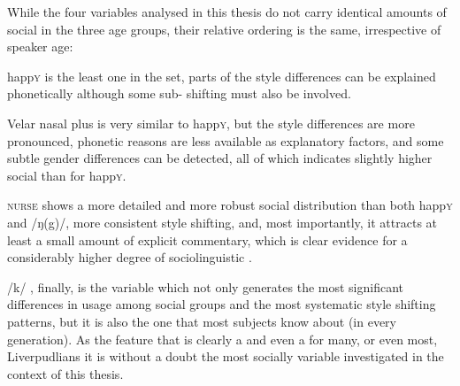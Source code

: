 While the four variables analysed in this thesis do not carry identical amounts of social  in the three age groups, their relative ordering is the same, irrespective of speaker age:
\begin{inparaenum}[(1)]
	\item happ\textsc{y} is the least  one in the set, parts of the style differences can be explained phonetically although some sub- shifting must also be involved.
	\item Velar nasal plus is very similar to happ\textsc{y}, but the style differences are more pronounced, phonetic reasons are less available as explanatory factors, and some subtle gender differences can be detected, all of which indicates slightly higher social  than for happ\textsc{y}.
	\item \textsc{nurse} shows a more detailed and more robust social distribution than both happ\textsc{y} and /ŋ(g)/, more consistent style shifting, and, most importantly, it attracts at least a small amount of explicit commentary, which is clear evidence for a considerably higher degree of sociolinguistic .
	\item /k/ , finally, is the variable which not only generates the most significant differences in usage among social groups and the most systematic style shifting patterns, but it is also the one that most subjects  know about (in every generation).
	As the feature that is clearly a  and even a  for many, or even most, Liverpudlians it is without a doubt the most socially  variable investigated in the context of this thesis.
\end{inparaenum}